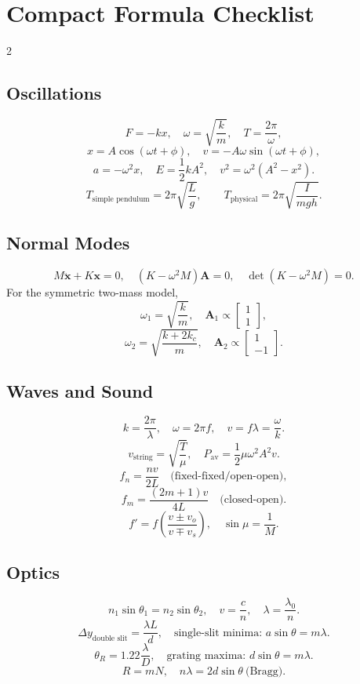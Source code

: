\documentclass[10pt,a4paper]{physicsquiz}
\begin{document}
\section{Compact Formula Checklist}
\begin{multicols}{2}
  \subsection*{Oscillations}
  \[
    F=-kx,\quad \omega=\sqrt{\frac{k}{m}},\quad T=\frac{2\pi}{\omega},
  \]
  \[
    x=A\cos(\omega t+\phi),\quad v=-A\omega\sin(\omega t+\phi),
  \]
  \[
    a=-\omega^2x,\quad E=\frac12kA^2,\quad v^2=\omega^2(A^2-x^2).
  \]
  \[
    T_{\text{simple pendulum}}=2\pi\sqrt{\frac{L}{g}},\qquad
    T_{\text{physical}}=2\pi\sqrt{\frac{I}{mgh}}.
  \]

  \subsection*{Normal Modes}
  \[
    M\ddot{\mathbf{x}}+K\mathbf{x}=0,
    \quad (K-\omega^2M)\mathbf{A}=0,
    \quad \det(K-\omega^2M)=0.
  \]
  For the symmetric two-mass model,
  \[
    \omega_1=\sqrt{\frac{k}{m}},\quad \mathbf{A}_1\propto\begin{bmatrix}1\\1\end{bmatrix},
  \]
  \[
    \omega_2=\sqrt{\frac{k+2k_c}{m}},\quad \mathbf{A}_2\propto\begin{bmatrix}1\\-1\end{bmatrix}.
  \]

  \subsection*{Waves and Sound}
  \[
    k=\frac{2\pi}{\lambda},\quad \omega=2\pi f,\quad v=f\lambda=\frac{\omega}{k}.
  \]
  \[
    v_{\text{string}}=\sqrt{\frac{T}{\mu}},\quad P_{\mathrm{av}}=\frac12\mu\omega^2A^2v.
  \]
  \[
    f_n=\frac{nv}{2L}\quad \text{(fixed-fixed/open-open)},
  \]
  \[
    f_m=\frac{(2m+1)v}{4L}\quad \text{(closed-open)}.
  \]
  \[
    f'=f\left(\frac{v\pm v_o}{v\mp v_s}\right),\quad
    \sin\mu=\frac{1}{M}.
  \]

  \subsection*{Optics}
  \[
    n_1\sin\theta_1=n_2\sin\theta_2,\quad v=\frac{c}{n},\quad \lambda=\frac{\lambda_0}{n}.
  \]
  \[
    \Delta y_{\text{double slit}}=\frac{\lambda L}{d},\quad
    \text{single-slit minima: }a\sin\theta=m\lambda.
  \]
  \[
    \theta_R=1.22\frac{\lambda}{D},\quad
    \text{grating maxima: }d\sin\theta=m\lambda.
  \]
  \[
    R=mN,\quad n\lambda=2d\sin\theta\ \text{(Bragg)}.
  \]
\end{multicols}
\end{document}
